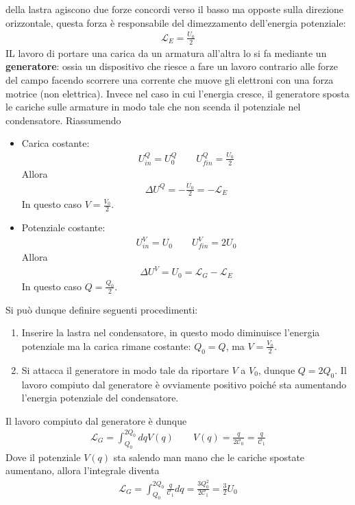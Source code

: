 \documentclass[a4paper, oneside]{article}
\begin{document}
della lastra agiscono due forze concordi verso il basso ma opposte sulla direzione 
orizzontale, questa forza è responsabile del dimezzamento dell'energia potenziale:
\begin{gather*}
    \mathcal{L}_{E} = \frac{U_0}{2}
\end{gather*}
IL lavoro di portare una carica da un armatura all'altra lo si fa mediante un \textbf{generatore}: ossia un 
dispositivo che riesce a fare un lavoro contrario alle forze del campo facendo 
scorrere una corrente che muove gli elettroni con una forza motrice (non elettrica). 
Invece nel caso in cui l'energia cresce, il generatore sposta le cariche sulle armature 
in modo tale che non scenda il potenziale nel condensatore. Riassumendo
\begin{itemize}
    \item Carica costante:
    \begin{gather*}
        U_{in}^{Q} = U_0^{Q} \qquad U_{fin}^{Q} = \frac{U_0}{2} 
    \end{gather*}
    Allora
    \begin{gather*}
        \Delta U^{Q} = - \frac{U_0}{2} = - \mathcal{L}_E
    \end{gather*}
    In questo caso $V = \frac{V_0}{2}$.
    \item Potenziale costante: 
    \begin{gather*}
        U_{in}^{V} = U_0 \qquad U_{fin}^{V} = 2U_0
    \end{gather*}
    Allora
    \begin{gather*}
        \Delta U^{V} = U_0 =  \mathcal{L}_G - \mathcal{L}_E
    \end{gather*}
    In questo caso $Q = \frac{Q_0}{2}$. 
\end{itemize}
Si può dunque definire seguenti procedimenti:
\begin{enumerate}
    \item Inserire la lastra nel condensatore, in questo modo 
    diminuisce l'energia potenziale ma la carica rimane costante:
    $Q_0 = Q$, ma $V = \frac{V_0}{2}$. 
    \item Si attacca il generatore in modo tale da riportare $V$ a $V_0$, 
    dunque $Q = 2Q_0$. Il lavoro compiuto dal generatore è ovviamente positivo 
    poiché sta aumentando l'energia potenziale del condensatore.
\end{enumerate}
Il lavoro compiuto dal generatore è dunque 
\begin{gather*}
    \mathcal{L}_G = \int_{Q_0}^{2Q_0} dq V(q)  \qquad V(q) = \frac{q}{2\mathcal{C}_0} = \frac{q}{\mathcal{C}_1}
\end{gather*}
Dove il potenziale $V(q)$ sta salendo man mano che le cariche spostate 
aumentano, allora l'integrale diventa
\begin{gather*}
    \mathcal{L}_G  = \int_{Q_0}^{2Q_0} \frac{q}{\mathcal{C}_1} dq = \frac{3Q_0^{2}}{2\mathcal{C}_1} = \frac{3}{2}U_0 
\end{gather*}
\end{document}
